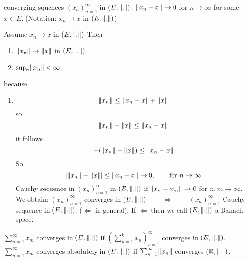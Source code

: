 

converging squences $(x_n)_{n=1}^{\infty}$ in $(E,\norm{.})$. $\norm{x_n-x} \to 0$ for $n \to \infty$ for some $x \in E$. (Notation: $x_n \to x$ in $(E,\norm{.})$)
\begin{bemerkung}
	Assume $x_n \to x$ in $(E,\norm{.})$ Then
	\begin{enumerate}[1)]
		\item $\norm{x_n} \to \norm{x}$ in $(E,\norm{.})$. 
		\item $\sup_{n} \norm{x_n} < \infty$.
	\end{enumerate}
	because
	\begin{enumerate}[1)]
		\item \[
			\norm{x_n} \leq \norm{x_n-x} + \norm{x}
		\]
		so
		\[
			\norm{x_n} - \norm{x} \leq \norm{x_n -x}
		\]
		it follows
		\[
			-(\norm{x_n}-\norm{x}) \leq \norm{x_n -x}
		\]
		So
		\[
			\abs{\norm{x_n}-\norm{x}} \leq \norm{x_n -x} \to 0, \qquad \text{for } n \to \infty
		\]
		Cauchy sequence in $(x_n)_{n=1}^{\infty}$ in $(E,\norm{.})$ if $\norm{x_n-x_m} \to 0$ for $n,m \to \infty$. \\
		We obtain:
	 	$(x_n)_{n=1}^{\infty}$ converges in $(E,\norm{.})$  $\qquad \Rightarrow \qquad$  $(x_n)_{n=1}^{\infty}$ Cauchy sequence in $(E,\norm{.})$. ($\not \Leftarrow $ in general).
		If $\Leftarrow$ then we call $(E,\norm{.})$ a Banach space. 
	\end{enumerate}
	$\sum_{n=1}^{\infty}x_m$ converges in $(E,\norm{.})$ if $\left( \sum_{n=1}^{k}x_n \right)_{k=1}^{\infty}$ converges in $(E,\norm{.})$. \\
	$\sum_{n=1}^{\infty}x_m$ converges absolutely in $(E,\norm{.})$ if $\sum_{n=1}^{\infty}\norm{x_n}$ converges $(\mathbb{R},\norm{.})$. \\
\end{bemerkung}

